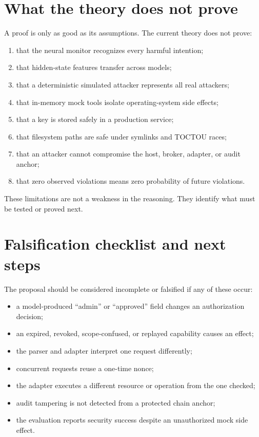 \documentclass[11pt]{article}
\begin{document}
\section{What the theory does not prove}

A proof is only as good as its assumptions. The current theory does not prove:
\begin{enumerate}
  \item that the neural monitor recognizes every harmful intention;
  \item that hidden-state features transfer across models;
  \item that a deterministic simulated attacker represents all real attackers;
  \item that in-memory mock tools isolate operating-system side effects;
  \item that a key is stored safely in a production service;
  \item that filesystem paths are safe under symlinks and TOCTOU races;
  \item that an attacker cannot compromise the host, broker, adapter, or audit anchor;
  \item that zero observed violations means zero probability of future violations.
\end{enumerate}

These limitations are not a weakness in the reasoning. They identify what must be tested or proved next.

\section{Falsification checklist and next steps}

The proposal should be considered incomplete or falsified if any of these occur:
\begin{itemize}
  \item a model-produced ``admin'' or ``approved'' field changes an authorization decision;
  \item an expired, revoked, scope-confused, or replayed capability causes an effect;
  \item the parser and adapter interpret one request differently;
  \item concurrent requests reuse a one-time nonce;
  \item the adapter executes a different resource or operation from the one checked;
  \item audit tampering is not detected from a protected chain anchor;
  \item the evaluation reports security success despite an unauthorized mock side effect.
\end{itemize}
\end{document}
